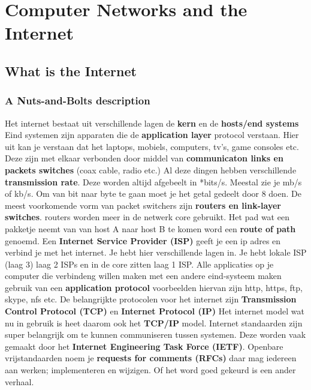 \section{Computer Networks and the Internet}

\subsection{What is the Internet}

\subsubsection{A Nuts-and-Bolts description}
Het internet bestaat uit verschillende lagen de \textbf{kern} en de \textbf{hosts/end systems} Eind systemen zijn apparaten die de \textbf{application layer} protocol verstaan. Hier uit kan je verstaan dat het laptops, mobiels, computers, tv's, game consoles etc. Deze zijn met elkaar verbonden door middel van \textbf{communicaton links en packets switches} (coax cable, radio etc.) Al deze dingen hebben verschillende \textbf{transmission rate}. Deze worden altijd afgebeelt in *bits/s. Meestal zie je mb/s of kb/s. Om van bit naar byte te gaan moet je het getal gedeelt door 8 doen.
\newline
De meest voorkomende vorm van packet switchers zijn \textbf{routers en link-layer switches}. routers worden meer in de netwerk core gebruikt. Het pad wat een pakketje neemt van van host A naar host B te komen word een \textbf{route of path} genoemd.
\newline
Een \textbf{Internet Service Provider (ISP)} geeft je een ip adres en verbind je met het internet. Je hebt hier verschillende lagen in. Je hebt lokale ISP (laag 3) laag 2 ISPs en in de core zitten laag 1 ISP.
\newline
Alle applicaties op je computer die verbindeng willen maken met een andere eind-systeem maken gebruik van een \textbf{application protocol} voorbeelden hiervan zijn http, https, ftp, skype, nfs etc. De belangrijkte protocolen voor het internet zijn \textbf{Transmission Control Protocol (TCP)} en \textbf{Internet Protocol (IP)} Het internet model wat nu in gebruik is heet daarom ook het \textbf{TCP/IP} model.
\newline
Internet standaarden zijn super belangrijk om te kunnen communiseren tussen systemen. Deze worden vaak gemaakt door het \textbf{Internet Engineering Task Force (IETF)}. Openbare vrijstandaarden noem je \textbf{requests for comments (RFCs)} daar mag iedereen aan werken; implementeren en wijzigen. Of het word goed gekeurd is een ander verhaal.

